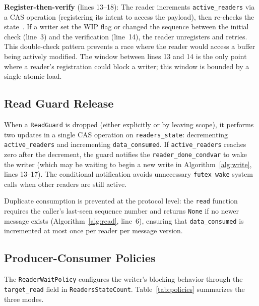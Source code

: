 \textbf{Register-then-verify} (lines 13--18): The reader increments \texttt{active\_readers} via a CAS operation (registering its intent to access the payload), then re-checks the state~\cite{lamport1977}. If a writer set the WIP flag or changed the sequence between the initial check (line~3) and the verification (line~14), the reader unregisters and retries. This double-check pattern prevents a race where the reader would access a buffer being actively modified. The window between lines 13 and 14 is the only point where a reader's registration could block a writer; this window is bounded by a single atomic load.

\subsection{Read Guard Release}
\label{subsec:guard_release}

\begin{sloppypar}
When a \texttt{ReadGuard} is dropped (either explicitly or by leaving scope), it performs two updates in a single CAS operation on \texttt{readers\_state}: decrementing \texttt{active\_readers} and incrementing \texttt{data\_consumed}.
If \texttt{active\_readers} reaches zero after the decrement, the guard notifies the \texttt{reader\_done\_condvar} to wake the writer (which may be waiting to begin a new write in Algorithm~\ref{alg:write}, lines 13--17).
The conditional notification avoids unnecessary \texttt{futex\_wake} system calls when other readers are still active.
\end{sloppypar}

Duplicate consumption is prevented at the protocol level: the \texttt{read} function requires the caller's last-seen sequence number and returns \texttt{None} if no newer message exists (Algorithm~\ref{alg:read}, line~6), ensuring that \texttt{data\_consumed} is incremented at most once per reader per message version.

\subsection{Producer-Consumer Policies}
\label{subsec:policies}

The \texttt{ReaderWaitPolicy} configures the writer's blocking behavior through the \texttt{target\_read} field in \texttt{ReadersStateCount}.
Table~\ref{tab:policies} summarizes the three modes.

